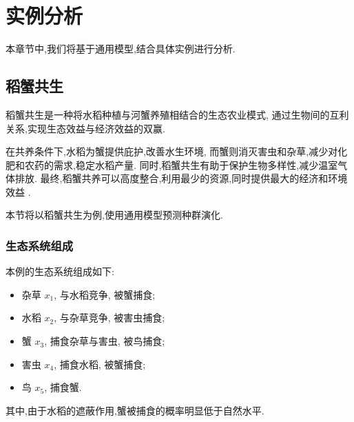 \documentclass[a4paper, twocolumn]{ctexart}
\begin{document}
\section{实例分析} \label{sec:example}
本章节中,我们将基于通用模型,结合具体实例进行分析.

\subsection{稻蟹共生} \label{sec:example:rice-crab}
稻蟹共生是一种将水稻种植与河蟹养殖相结合的生态农业模式,
通过生物间的互利关系,实现生态效益与经济效益的双赢.

在共养条件下,水稻为蟹提供庇护,改善水生环境,
而蟹则消灭害虫和杂草,减少对化肥和农药的需求,稳定水稻产量.
同时,稻蟹共生有助于保护生物多样性,减少温室气体排放.
最终,稻蟹共养可以高度整合,利用最少的资源,同时提供最大的经济和环境效益
\autocite{rice-crab-30-years}.

本节将以稻蟹共生为例,使用通用模型预测种群演化.

\subsubsection{生态系统组成}
本例的生态系统组成如下:
\begin{itemize}
    \item 杂草 $x_1$, 与水稻竞争, 被蟹捕食;
    \item 水稻 $x_2$, 与杂草竞争, 被害虫捕食;
    \item 蟹 $x_3$, 捕食杂草与害虫, 被鸟捕食;
    \item 害虫 $x_4$, 捕食水稻, 被蟹捕食;
    \item 鸟 $x_5$, 捕食蟹.
\end{itemize}
其中,由于水稻的遮蔽作用,蟹被捕食的概率明显低于自然水平.
\end{document}

